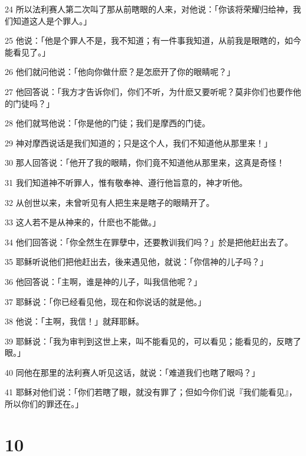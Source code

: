 \par 24 所以法利赛人第二次叫了那从前瞎眼的人来，对他说：「你该将荣耀归给神，我们知道这人是个罪人。」
\par 25 他说：「他是个罪人不是，我不知道；有一件事我知道，从前我是眼瞎的，如今能看见了。」
\par 26 他们就问他说：「他向你做什麽？是怎麽开了你的眼睛呢？」
\par 27 他回答说：「我方才告诉你们，你们不听，为什麽又要听呢？莫非你们也要作他的门徒吗？」
\par 28 他们就骂他说：「你是他的门徒；我们是摩西的门徒。
\par 29 神对摩西说话是我们知道的；只是这个人，我们不知道他从那里来！」
\par 30 那人回答说：「他开了我的眼睛，你们竟不知道他从那里来，这真是奇怪！
\par 31 我们知道神不听罪人，惟有敬奉神、遵行他旨意的，神才听他。
\par 32 从创世以来，未曾听见有人把生来是瞎子的眼睛开了。
\par 33 这人若不是从神来的，什麽也不能做。」
\par 34 他们回答说：「你全然生在罪孽中，还要教训我们吗？」於是把他赶出去了。
\par 35 耶稣听说他们把他赶出去，後来遇见他，就说：「你信神的儿子吗？」
\par 36 他回答说：「主啊，谁是神的儿子，叫我信他呢？」
\par 37 耶稣说：「你已经看见他，现在和你说话的就是他。」
\par 38 他说：「主啊，我信！」就拜耶稣。
\par 39 耶稣说：「我为审判到这世上来，叫不能看见的，可以看见；能看见的，反瞎了眼。」
\par 40 同他在那里的法利赛人听见这话，就说：「难道我们也瞎了眼吗？」
\par 41 耶稣对他们说：「你们若瞎了眼，就没有罪了；但如今你们说『我们能看见』，所以你们的罪还在。」

\chapter{10}

